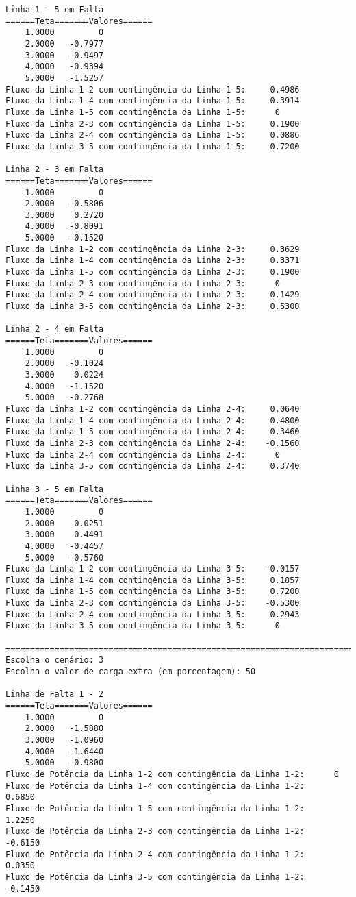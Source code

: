 \begin{verbatim}
Linha 1 - 5 em Falta
======Teta=======Valores======
    1.0000         0
    2.0000   -0.7977
    3.0000   -0.9497
    4.0000   -0.9394
    5.0000   -1.5257
Fluxo da Linha 1-2 com contingência da Linha 1-5:     0.4986
Fluxo da Linha 1-4 com contingência da Linha 1-5:     0.3914
Fluxo da Linha 1-5 com contingência da Linha 1-5:      0
Fluxo da Linha 2-3 com contingência da Linha 1-5:     0.1900
Fluxo da Linha 2-4 com contingência da Linha 1-5:     0.0886
Fluxo da Linha 3-5 com contingência da Linha 1-5:     0.7200

Linha 2 - 3 em Falta
======Teta=======Valores======
    1.0000         0
    2.0000   -0.5806
    3.0000    0.2720
    4.0000   -0.8091
    5.0000   -0.1520
Fluxo da Linha 1-2 com contingência da Linha 2-3:     0.3629
Fluxo da Linha 1-4 com contingência da Linha 2-3:     0.3371
Fluxo da Linha 1-5 com contingência da Linha 2-3:     0.1900
Fluxo da Linha 2-3 com contingência da Linha 2-3:      0
Fluxo da Linha 2-4 com contingência da Linha 2-3:     0.1429
Fluxo da Linha 3-5 com contingência da Linha 2-3:     0.5300

Linha 2 - 4 em Falta
======Teta=======Valores======
    1.0000         0
    2.0000   -0.1024
    3.0000    0.0224
    4.0000   -1.1520
    5.0000   -0.2768
Fluxo da Linha 1-2 com contingência da Linha 2-4:     0.0640
Fluxo da Linha 1-4 com contingência da Linha 2-4:     0.4800
Fluxo da Linha 1-5 com contingência da Linha 2-4:     0.3460
Fluxo da Linha 2-3 com contingência da Linha 2-4:    -0.1560
Fluxo da Linha 2-4 com contingência da Linha 2-4:      0
Fluxo da Linha 3-5 com contingência da Linha 2-4:     0.3740

Linha 3 - 5 em Falta
======Teta=======Valores======
    1.0000         0
    2.0000    0.0251
    3.0000    0.4491
    4.0000   -0.4457
    5.0000   -0.5760
Fluxo da Linha 1-2 com contingência da Linha 3-5:    -0.0157
Fluxo da Linha 1-4 com contingência da Linha 3-5:     0.1857
Fluxo da Linha 1-5 com contingência da Linha 3-5:     0.7200
Fluxo da Linha 2-3 com contingência da Linha 3-5:    -0.5300
Fluxo da Linha 2-4 com contingência da Linha 3-5:     0.2943
Fluxo da Linha 3-5 com contingência da Linha 3-5:      0

=======================================================================
Escolha o cenário: 3
Escolha o valor de carga extra (em porcentagem): 50

Linha de Falta 1 - 2
======Teta=======Valores======
    1.0000         0
    2.0000   -1.5880
    3.0000   -1.0960
    4.0000   -1.6440
    5.0000   -0.9800
Fluxo de Potência da Linha 1-2 com contingência da Linha 1-2:      0
Fluxo de Potência da Linha 1-4 com contingência da Linha 1-2:     0.6850
Fluxo de Potência da Linha 1-5 com contingência da Linha 1-2:     1.2250
Fluxo de Potência da Linha 2-3 com contingência da Linha 1-2:    -0.6150
Fluxo de Potência da Linha 2-4 com contingência da Linha 1-2:     0.0350
Fluxo de Potência da Linha 3-5 com contingência da Linha 1-2:    -0.1450


\end{verbatim}
